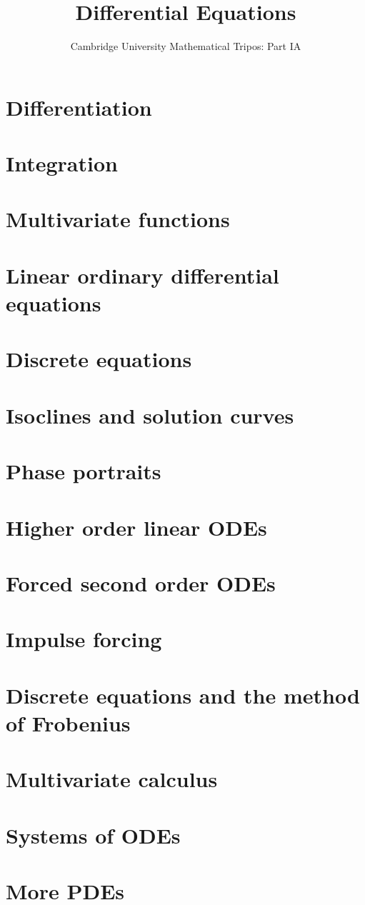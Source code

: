 \documentclass{article}
\title{Differential Equations}
\author{Cambridge University Mathematical Tripos: Part IA}
\begin{document}
\maketitle

\tableofcontentsnewpage{}

\section{Differentiation}

\section{Integration}

\section{Multivariate functions}

\section{Linear ordinary differential equations}

\section{Discrete equations}

\section{Isoclines and solution curves}

\section{Phase portraits}

\section{Higher order linear ODEs}

\section{Forced second order ODEs}

\section{Impulse forcing}

\section{Discrete equations and the method of Frobenius}

\section{Multivariate calculus}

\section{Systems of ODEs}

\section{More PDEs}

\end{document}
